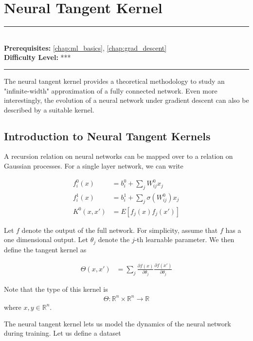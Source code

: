\documentclass[book.tex]{subfiles}
\begin{document}
\chapter{Neural Tangent Kernel}
\label{chap:ntk}
\noindent\rule{11cm}{0.4pt} \\
\textbf{Prerequisites:}  \autoref{chap:ml_basics}, \autoref{chap:grad_descent}  \\
\textbf{Difficulty Level:} *** \\
\noindent\rule{11cm}{0.4pt}
\vspace{5mm}

The neural tangent kernel provides a theoretical methodology to study an "infinite-width" approximation of a fully connected network. Even more interestingly, the evolution of a neural network under gradient descent can also be described by a suitable kernel. 

\section{Introduction to Neural Tangent Kernels}

A recursion relation on neural networks can be mapped over to a relation on Gaussian processes. For a single layer network, we can write

\begin{align}
f_i^0(x) &= b_i^0 + \sum_j W^0_{ij} x_j \\
f_i^1(x) &= b_i^1 + \sum_j \sigma(W^0_{ij}) x_j \\
K^0(x, x') &= E[f_j(x)f_j(x')]
\end{align}

Let $f$ denote the output of the full network. For simplicity, assume that $f$ has a one dimensional output. Let $\theta_j$ denote the $j$-th learnable parameter. We then define the tangent kernel as

\begin{align}
\Theta(x, x') &= \sum_j \frac{\partial f(x)}{\partial \theta_j} \frac{\partial f(x')}{\partial \theta_j}
\end{align}

Note that the type of this kernel is
\begin{align}
\Theta: \mathbb{R}^n \times \mathbb{R}^n \to \mathbb{R}
\end{align}
where $x, y \in \mathbb{R}^n$. 

The neural tangent kernel lets us model the dynamics of the neural network during training. Let us define a dataset
\end{document}
